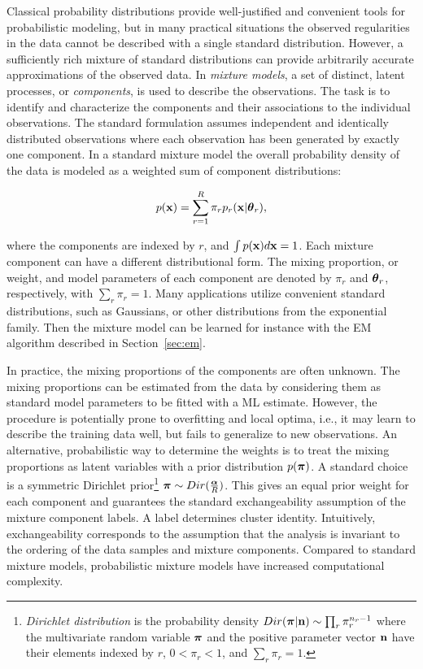 Classical probability distributions provide well-justified and
convenient tools for probabilistic modeling, but in many practical
situations the observed regularities in the data cannot be described
with a single standard distribution. However, a sufficiently rich
mixture of standard distributions can provide arbitrarily accurate
approximations of the observed data. In {\it mixture models}, a set of
distinct, latent processes, or {\it components}, is used to describe
the observations. The task is to identify and characterize the
components and their associations to the individual observations. The
standard formulation assumes independent and identically distributed
observations where each observation has been generated by exactly one
component. In a standard mixture model the overall probability density
of the data is modeled as a weighted sum of component distributions:

\begin{equation}\label{eq:mixture}
   p(\mathbf{x}) = \sum_{r=1}^R \pi_r p_r(\mathbf{x} | \boldsymbol{\theta}_r),
\end{equation}

\noindent where the components are indexed by \(r\), and $\int p(\mathbf{x})
d\mathbf{x} = 1$. Each mixture component can have a different distributional
form.  The mixing proportion, or weight, and model parameters of each
component are denoted by $\pi_r$ and \(\boldsymbol{\theta}_r\), respectively, with
$\sum_r \pi_r = 1$. Many applications utilize convenient standard
distributions, such as Gaussians, or other distributions from the
exponential family. Then the mixture model can be learned for instance
with the EM algorithm described in Section~\ref{sec:em}.

In practice, the mixing proportions of the components are often
unknown. The mixing proportions can be estimated from the data by
considering them as standard model parameters to be fitted with a ML
estimate. However, the procedure is potentially prone to overfitting
and local optima, i.e., it may learn to describe the training data
well, but fails to generalize to new observations. An alternative,
probabilistic way to determine the weights is to treat the mixing
proportions as latent variables with a prior distribution
\(p({\boldsymbol \pi})\). A standard choice is a symmetric Dirichlet
prior\footnote{{\it Dirichlet distribution} is the probability density
  \(Dir({\boldsymbol \pi} | \mathbf{n}) \sim \prod_r \pi_r^{n_r - 1}\) where the
  multivariate random variable \({\boldsymbol \pi}\) and the positive parameter
  vector \(\mathbf{n}\) have their elements indexed by \(r\), \(0 < \pi_r <
  1\), and \(\sum_r \pi_r = 1\).}  \({\boldsymbol \pi} \sim
Dir(\frac{{\boldsymbol \alpha}}{R})\). This gives an equal prior weight for each
component and guarantees the standard exchangeability assumption of
the mixture component labels. A label determines cluster
identity. Intuitively, exchangeability corresponds to the assumption
that the analysis is invariant to the ordering of the data samples and
mixture components. Compared to standard mixture models, probabilistic
mixture models have increased computational complexity.

